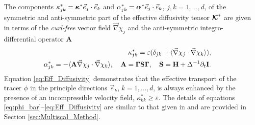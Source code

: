\documentclass[11pt]{amsart}
\newcommand{\Hb}{\mathbf{H}}
\newcommand{\Ib}{\mathbf{I}}
\newcommand{\Sb}{\mathbf{S}}
\newcommand{\Ab}{\mathbf{A}}
\newcommand\Kbc{\mbox{\boldmath${\mathcal{K}}$}}
\newcommand\balpha{\mbox{\boldmath${\alpha}$}}
\newcommand\bkappa{\mbox{\boldmath${\kappa}$}}
\newcommand\bGamma{\mbox{\boldmath${\Gamma}$}}
\begin{document}
The components
$\kappa^*_{jk}=\bkappa^*\vec{e}_j\cdot\vec{e}_k$ and
$\alpha^*_{jk}=\balpha^*\vec{e}_j\cdot\vec{e}_k$, $j,k=1,\ldots,d$, of the symmetric
and anti-symmetric part of the effective diffusivity tensor $\Kbc^*$
are given in terms of the \emph{curl-free} vector field $\vec{\nabla}\chi_j$
and the anti-symmetric integro-differential operator $\Ab$
\cite{Fannjiang:SIAM_JAM:333}   
% 
\begin{align}\label{eq:Eff_Diffusivity_2}  
   \kappa^*_{jk}%
       =\varepsilon(\delta_{jk}+\langle\vec{\nabla}\chi_j\cdot\vec{\nabla}\chi_k\rangle), \\
   \alpha^*_{jk}=-\langle\Ab\vec{\nabla}\chi_j\cdot\vec{\nabla}\chi_k\rangle, \quad \Ab=\bGamma\Sb\bGamma,
   \quad \Sb=\Hb+\Delta^{-1}\partial_t\Ib.
\end{align}
Equation \eqref{eq:Eff_Diffusivity} demonstrates that the effective
transport of the tracer $\phi$ in the principle directions $\vec{e}_k$,
$k=1,\ldots,d$, is always enhanced by the presence of an incompressible
velocity field, $\kappa^*_{kk}\geq\varepsilon$. The details of equations
\eqref{eq:phi_bar}--\eqref{eq:Eff_Diffusivity} are similar to that
given in \cite{McLaughlin:SIAM_JAM:780,Fannjiang:SIAM_JAM:333} and are
provided in Section \ref{sec:Multiscal_Method}. 
\end{document}

